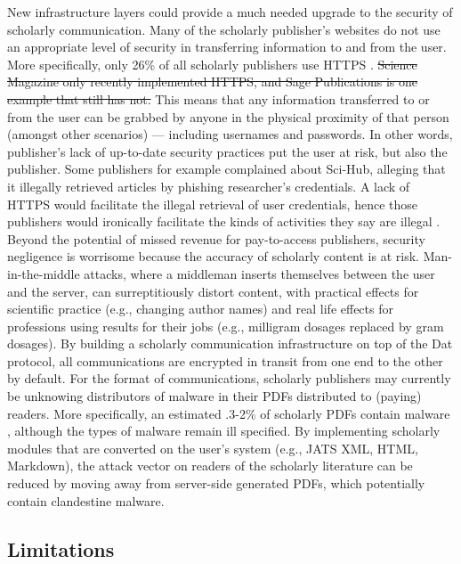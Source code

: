 \documentclass[publications,article,submit,moreauthors,pdftex,10pt,a4paper]{Definitions/mdpi}
\providecommand{\DIFdeltex}[1]{{\protect\color{red}\sout{#1}}}                      %
\providecommand{\DIFdelbegin}{} %
\providecommand{\DIFdelend}{} %
\providecommand{\DIFdel}[1]{\texorpdfstring{\DIFdeltex{#1}}{}} %
\newcommand{\DIFscaledelfig}{0.5}
\newlength{\DIFdelgraphicswidth} %
\newlength{\DIFdelgraphicsheight} %
\newcommand{\DIFdelincludegraphics}[2][]{%
\sbox{\DIFdelgraphicsbox}{\DIFOincludegraphics[#1]{#2}}%
\settoboxwidth{\DIFdelgraphicswidth}{\DIFdelgraphicsbox} %
\settoboxtotalheight{\DIFdelgraphicsheight}{\DIFdelgraphicsbox} %
\scalebox{\DIFscaledelfig}{%
\parbox[b]{\DIFdelgraphicswidth}{\usebox{\DIFdelgraphicsbox}\\[-\baselineskip] \rule{\DIFdelgraphicswidth}{0em}}\llap{\resizebox{\DIFdelgraphicswidth}{\DIFdelgraphicsheight}{%
\setlength{\unitlength}{\DIFdelgraphicswidth}%
\begin{picture}(1,1)%
\thicklines\linethickness{2pt} %
{\color[rgb]{1,0,0}\put(0,0){\framebox(1,1){}}}%
{\color[rgb]{1,0,0}\put(0,0){\line( 1,1){1}}}%
{\color[rgb]{1,0,0}\put(0,1){\line(1,-1){1}}}%
\end{picture}%
}\hspace*{3pt}}} %
} %
\DeclareRobustCommand{\DIFdelbegin}{\DIFOdelbegin \let\includegraphics\DIFdelincludegraphics} %
\DeclareRobustCommand{\DIFdelend}{\DIFOaddend \let\includegraphics\DIFOincludegraphics} %
\begin{document}
New infrastructure layers could provide a much needed upgrade to the
security of scholarly communication. Many of the scholarly publisher's
websites do not use an appropriate level of security in transferring
information to and from the user. More specifically, only 26\% of all
scholarly publishers use HTTPS \citep{https-hartgerink}. \DIFdelbegin \DIFdel{Science Magazine only recently implemented HTTPS, and Sage Publications is one example that still has not. }\DIFdelend This means
that any information transferred to or from the user can be grabbed by
anyone in the physical proximity of that person (amongst other
scenarios) --- including usernames and passwords. In other words,
publisher's lack of up-to-date security practices put the user at
risk, but also the publisher. Some publishers for example complained
about Sci-Hub, alleging that it illegally retrieved articles by
phishing researcher's credentials. A lack of HTTPS would facilitate
the illegal retrieval of user credentials, hence those publishers
would ironically facilitate the kinds of activities they say are
illegal \citep{doi:10.1126/science.aaf5664}. Beyond the potential of
missed revenue for pay-to-access publishers, security negligence is
worrisome because the accuracy of scholarly content is at
risk. Man-in-the-middle attacks, where a middleman inserts themselves
between the user and the server, can surreptitiously distort content,
with practical effects for scientific practice (e.g., changing author
names) and real life effects for professions using results for their
jobs (e.g., milligram dosages replaced by gram dosages). By building a
scholarly communication infrastructure on top of the Dat protocol, all
communications are encrypted in transit from one end to the other by
default. For the format of communications, scholarly publishers may
currently be unknowing distributors of malware in their PDFs
distributed to (paying) readers. More specifically, an estimated
.3-2\% of scholarly PDFs contain malware
\citep{doi:10.3233/978-1-61499-744-3-107}, although the types of
malware remain ill specified. By implementing scholarly modules that
are converted on the user's system (e.g., JATS XML, HTML, Markdown),
the attack vector on readers of the scholarly literature can be
reduced by moving away from server-side generated PDFs, which
potentially contain clandestine malware.

\subsection{Limitations}
\end{document}
